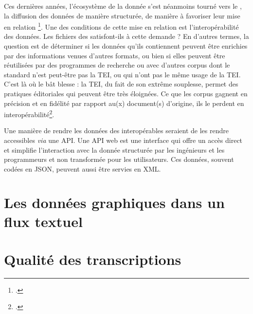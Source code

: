 Ces dernières années, l'écosystème de la donnée s'est néanmoins tourné vers le \linkeddata, \cad{} la diffusion des données \og de manière structurée, de manière à favoriser leur mise en relation \fg\footcite[p. 66]{jolivet}. Une des conditions de cette mise en relation est l'interopérabilité des données. Les fichiers des \odm{} satisfont-ils à cette demande ? En d'autres termes, la question est de déterminer si les données qu'ils contiennent peuvent être enrichies par des informations venues d'autres formats, ou bien si elles peuvent être réutilisées par des programmes de recherche ou avec d'autres corpus dont le standard n'est peut-être pas la TEI, ou qui n'ont pas le même usage de la TEI. C'est là où le bât blesse : la TEI, du fait de son extrême souplesse, permet des pratiques éditoriales qui peuvent être très éloignées. Ce que les corpus gagnent en précision et en fidélité par rapport au(x) document(s) d'origine, ils le perdent en interopérabilité\footcite[p. 61-62]{jolivet}.

Une manière de rendre les données des \odm{} interopérables seraient de les rendre accessibles \textit{via} une API. Une API web est une interface qui offre un accès direct et simplifie l'interaction avec la donnée structurée par les ingénieurs et les programmeurs et non transformée pour les utilisateurs. Ces données, souvent codées en JSON, peuvent aussi être servies en XML. 

\chapter{Les données graphiques dans un flux textuel}

\chapter{Qualité des transcriptions}